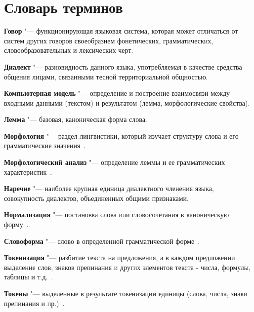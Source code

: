 \chapter*{Словарь терминов}             %

\textbf{Говор} "--- функционирующая языковая система, которая может отличаться от систем других говоров своеобразием фонетических, грамматических, словообразовательных и лексических черт.~
\cite{NovakPenttonenRuuskanenSiilin2019}

\textbf{Диалект} "--- разновидность данного языка, употребляемая в качестве средства общения лицами, связанными тесной территориальной общностью.~
\cite{NovakPenttonenRuuskanenSiilin2019}

\textbf{Компьютерная модель} "--- определение и построение взаимосвязи между входными данными (текстом) и результатом (лемма, морфологические свойства).

\textbf{Лемма} "--- базовая, каноническая форма слова.

\textbf{Морфология} "--- раздел лингвистики, который изучает структуру слова и его грамматические значения~\cite{MitreninaNikolaevLando2016}.

\textbf{Морфологический анализ} "--- определение леммы и ее грамматических характеристик~\cite{MitreninaNikolaevLando2016}.

\textbf{Наречие} "--- наиболее крупная единица диалектного членения языка, совокупность диалектов, объединенных общими признаками.~
\cite{NovakPenttonenRuuskanenSiilin2019}

\textbf{Нормализация} "--- постановка слова или словосочетания в каноническую форму~\cite{MitreninaNikolaevLando2016}.

\textbf{Словоформа} "--- слово в определенной грамматической форме~\cite{MitreninaNikolaevLando2016}.

\textbf{Токенизация} "--- разбитие текста на предложения, а в каждом предложении выделение слов, знаков препинания и других элементов текста - числа, формулы, таблицы и т.д.~\cite{MitreninaNikolaevLando2016}.

\textbf{Токены} "--- выделенные в результате токенизации единицы (слова, числа, знаки препинания и пр.)~\cite{MitreninaNikolaevLando2016}.